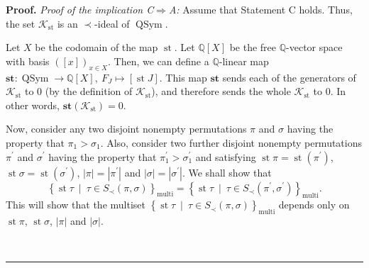 \documentclass[numbers=enddot,12pt,final,onecolumn,notitlepage]{scrartcl}%
\theoremstyle{definition}
\newenvironment{proof}[1][Proof]{\noindent\textbf{#1.} }{\ \rule{0.5em}{0.5em}}
\newenvironment{verlong}{}{}
\begin{document}
\begin{verlong}
\begin{proof}
\textit{Proof of the implication C}$\Longrightarrow$\textit{A:} Assume that
Statement C holds. Thus, the set $\mathcal{K}_{\operatorname{st}}$ is an
$\left.  \prec\right.  $-ideal of $\operatorname*{QSym}$.

Let $X$ be the codomain of the map $\operatorname{st}$. Let $\mathbb{Q}%
\left[  X\right]  $ be the free $\mathbb{Q}$-vector space with basis $\left(
\left[  x\right]  \right)  _{x\in X}$. Then, we can define a $\mathbb{Q}%
$-linear map $\mathbf{st}:\operatorname*{QSym}\rightarrow\mathbb{Q}\left[
X\right]  ,\ F_{J}\mapsto\left[  \operatorname{st}J\right]  $. This map
$\mathbf{st}$ sends each of the generators of $\mathcal{K}_{\operatorname{st}%
}$ to $0$ (by the definition of $\mathcal{K}_{\operatorname{st}}$), and
therefore sends the whole $\mathcal{K}_{\operatorname{st}}$ to $0$. In other
words, $\mathbf{st}\left(  \mathcal{K}_{\operatorname{st}}\right)  =0$.

Now, consider any two disjoint nonempty permutations $\pi$ and $\sigma$ having
the property that $\pi_{1}>\sigma_{1}$. Also, consider two further disjoint
nonempty permutations $\pi^{\prime}$ and $\sigma^{\prime}$ having the property
that $\pi_{1}^{\prime}>\sigma_{1}^{\prime}$ and satisfying $\operatorname{st}
\pi =\operatorname{st}\left(  \pi^{\prime}\right)  $,
$\operatorname{st} \sigma   =\operatorname{st}\left(
\sigma^{\prime}\right)  $, $\left\vert \pi\right\vert =\left\vert \pi^{\prime
}\right\vert $ and $\left\vert \sigma\right\vert =\left\vert \sigma^{\prime
}\right\vert $. We shall show that
\[
\left\{  \operatorname{st} \tau
\ \mid\ \tau\in S_{\prec}\left(  \pi,\sigma\right)  \right\}
_{\operatorname*{multi}}=\left\{  \operatorname{st} \tau 
\ \mid\ \tau\in S_{\prec}\left(  \pi^{\prime},\sigma^{\prime}\right)
\right\}  _{\operatorname*{multi}} .
\]
This will show that the multiset
$\left\{  \operatorname{st} \tau   \ \mid\ \tau\in S_{\prec
}\left(  \pi,\sigma\right)  \right\}  _{\operatorname*{multi}}$ depends only
on $\operatorname{st} \pi   $, $\operatorname{st} \sigma$,
$\left\vert \pi\right\vert $ and $\left\vert \sigma \right\vert $.


\end{proof}
\end{verlong}
\end{document}
